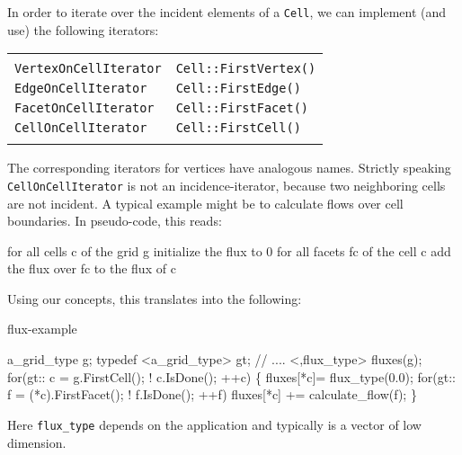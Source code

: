     In order to iterate 
    over the incident elements of a {\tt Cell}, 
    we can implement (and use) the following iterators:

    \begin{tabular}{ll} 
      \T\\
      {\tt VertexOnCellIterator} &  {\tt Cell::FirstVertex()}  \\ 
      {\tt EdgeOnCellIterator} &   {\tt Cell::FirstEdge()} \\ 
      {\tt FacetOnCellIterator} &  {\tt Cell::FirstFacet()}  \\
      {\tt CellOnCellIterator} &  {\tt Cell::FirstCell()} 
      \T\\  \\
    \end{tabular}

    The corresponding iterators for vertices have analogous names.
    Strictly speaking {\tt CellOnCellIterator}  is not an 
    incidence-iterator, because two
    neighboring cells are not incident.
    A typical example might be to calculate flows over cell boundaries.
    In pseudo-code, this reads:
    \begin{example}
     for all cells c of the grid g
        initialize the flux to 0
        for all facets fc  of the cell c
          add the flux over fc to the flux of c
    \end{example}
     
   Using our concepts, this translates into the following:
 
    \begin{Label}{flux-example}
 
  \begin{example}
 a_grid_type g;
 typedef <a_grid_type> gt;
 // ....
 <,flux\_type> fluxes(g);
 for(gt:: c = g.FirstCell(); ! c.IsDone(); ++c) \{
   fluxes[*c]= flux\_type(0.0);
   for(gt:: f = (*c).FirstFacet(); ! f.IsDone(); ++f)
     fluxes[*c] += calculate\_flow(f);
   \}
\end{example}
\end{Label}

Here {\tt flux\_type} depends on the application and typically is a vector
of low dimension.
